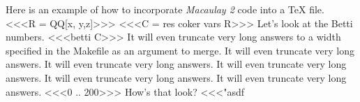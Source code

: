 \documentclass{minimal}
\def\M2{{\em Macaulay 2\/}}
\begin{document}
\noindent
Here is an example of how to incorporate \M2{} code into a TeX file.
<<<R = QQ[x,
         y,z]>>>
<<<C = res coker vars R>>>
Let's look at the Betti numbers.
<<<betti C>>>
It will even truncate very long answers to a width specified in the Makefile
as an argument to merge.
It will even truncate very long answers.
It will even truncate very long answers.
It will even truncate very long answers.
It will even truncate very long answers.
It will even truncate very long answers.
<<<0 .. 200>>>
How's that look?
<<<"asdf\n\nasdf{}%
\end{document}

